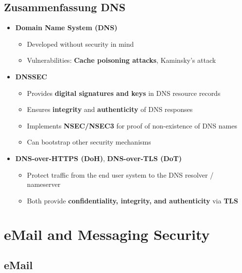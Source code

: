 \subsection{Zusammenfassung DNS}
\begin{itemize}
    \item \textbf{Domain Name System (DNS)}
    \begin{itemize}
        \item Developed without security in mind
        \item Vulnerabilities: \textbf{Cache poisoning attacks}, Kaminsky's attack
    \end{itemize}
    \item \textbf{DNSSEC}
    \begin{itemize}
        \item Provides \textbf{digital signatures and keys} in DNS resource records
        \item Ensures \textbf{integrity} and \textbf{authenticity} of DNS responses
        \item Implements \textbf{NSEC/NSEC3} for proof of non-existence of DNS names
        \item Can bootstrap other security mechanisms
    \end{itemize}
    \item \textbf{DNS-over-HTTPS (DoH)}, \textbf{DNS-over-TLS (DoT)}
    \begin{itemize}
        \item Protect traffic from the end user system to the DNS resolver / nameserver
        \item Both provide \textbf{confidentiality, integrity, and authenticity} via \textbf{TLS}
    \end{itemize}
\end{itemize}

\section{eMail and Messaging Security}
\subsection{eMail}
